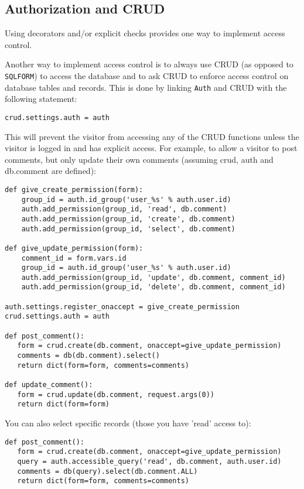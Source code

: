\documentclass[justified,sixbynine,notoc]{tufte-book}
\def\ft{\small\tt}
\begin{document}
\begin{fullwidth}
\goodbreak\subsection{Authorization and CRUD}

Using decorators and/or explicit checks provides one way to implement access control.

Another way to implement access control is to always use CRUD (as opposed to {\ft SQLFORM}) to access the database and to ask CRUD to enforce access control on database tables and records. This is done by linking {\ft Auth} and CRUD with the following statement:
\begin{lstlisting}
crud.settings.auth = auth
\end{lstlisting}

This will prevent the visitor from accessing any of the CRUD functions unless the visitor is logged in and has explicit access. For example, to allow a visitor to post comments, but only update their own comments (assuming crud, auth and db.comment are defined):
\begin{lstlisting}
def give_create_permission(form):
    group_id = auth.id_group('user_%s' % auth.user.id)
    auth.add_permission(group_id, 'read', db.comment)
    auth.add_permission(group_id, 'create', db.comment)
    auth.add_permission(group_id, 'select', db.comment)

def give_update_permission(form):
    comment_id = form.vars.id
    group_id = auth.id_group('user_%s' % auth.user.id)
    auth.add_permission(group_id, 'update', db.comment, comment_id)
    auth.add_permission(group_id, 'delete', db.comment, comment_id)

auth.settings.register_onaccept = give_create_permission
crud.settings.auth = auth

def post_comment():
   form = crud.create(db.comment, onaccept=give_update_permission)
   comments = db(db.comment).select()
   return dict(form=form, comments=comments)

def update_comment():
   form = crud.update(db.comment, request.args(0))
   return dict(form=form)
\end{lstlisting}

You can also select specific records (those you have 'read' access to):
\begin{lstlisting}
def post_comment():
   form = crud.create(db.comment, onaccept=give_update_permission)
   query = auth.accessible_query('read', db.comment, auth.user.id)
   comments = db(query).select(db.comment.ALL)
   return dict(form=form, comments=comments)
\end{lstlisting}


\end{fullwidth}
\end{document}
